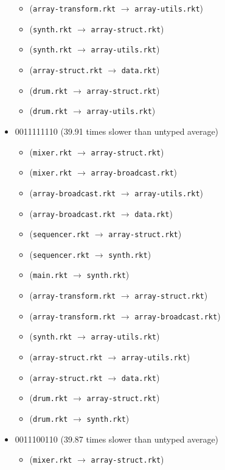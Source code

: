 \documentclass{article}
\newcommand{\mono}[1]{\texttt{#1}}
\begin{document}
\begin{itemize}
\begin{itemize}
  \item (\mono{array-transform.rkt} $\rightarrow$ \mono{array-utils.rkt})
  \item (\mono{synth.rkt} $\rightarrow$ \mono{array-struct.rkt})
  \item (\mono{synth.rkt} $\rightarrow$ \mono{array-utils.rkt})
  \item (\mono{array-struct.rkt} $\rightarrow$ \mono{data.rkt})
  \item (\mono{drum.rkt} $\rightarrow$ \mono{array-struct.rkt})
  \item (\mono{drum.rkt} $\rightarrow$ \mono{array-utils.rkt})
  \end{itemize}
\item 0011111110 (39.91 times slower than untyped average)
  \begin{itemize}
  \item (\mono{mixer.rkt} $\rightarrow$ \mono{array-struct.rkt})
  \item (\mono{mixer.rkt} $\rightarrow$ \mono{array-broadcast.rkt})
  \item (\mono{array-broadcast.rkt} $\rightarrow$ \mono{array-utils.rkt})
  \item (\mono{array-broadcast.rkt} $\rightarrow$ \mono{data.rkt})
  \item (\mono{sequencer.rkt} $\rightarrow$ \mono{array-struct.rkt})
  \item (\mono{sequencer.rkt} $\rightarrow$ \mono{synth.rkt})
  \item (\mono{main.rkt} $\rightarrow$ \mono{synth.rkt})
  \item (\mono{array-transform.rkt} $\rightarrow$ \mono{array-struct.rkt})
  \item (\mono{array-transform.rkt} $\rightarrow$ \mono{array-broadcast.rkt})
  \item (\mono{synth.rkt} $\rightarrow$ \mono{array-utils.rkt})
  \item (\mono{array-struct.rkt} $\rightarrow$ \mono{array-utils.rkt})
  \item (\mono{array-struct.rkt} $\rightarrow$ \mono{data.rkt})
  \item (\mono{drum.rkt} $\rightarrow$ \mono{array-struct.rkt})
  \item (\mono{drum.rkt} $\rightarrow$ \mono{synth.rkt})
  \end{itemize}
\item 0011100110 (39.87 times slower than untyped average)
  \begin{itemize}
  \item (\mono{mixer.rkt} $\rightarrow$ \mono{array-struct.rkt})

\end{itemize}
\end{itemize}
\end{document}
